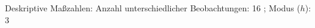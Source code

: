 				\label{tableValues:cjob09}
				\vspace*{-\baselineskip}
                    \begin{noten}
                	    \note{} Deskriptive Maßzahlen:
                	    Anzahl unterschiedlicher Beobachtungen: 16%
                	    ; 
                	      Modus ($h$): 3
                     \end{noten}


